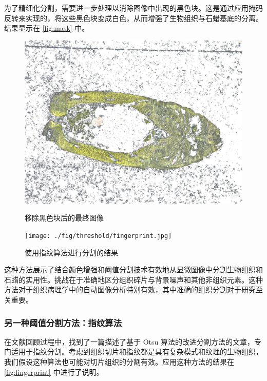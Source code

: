为了精细化分割，需要进一步处理以消除图像中出现的黑色块。这是通过应用掩码反转来实现的，将这些黑色块变成白色，从而增强了生物组织与石蜡基底的分离。结果显示在 \autoref{fig:mask} 中。

\begin{figure}[H]
    \centering
    \begin{minipage}{0.4\textwidth}
        \centering
        \includegraphics[width=\textwidth]{./fig/threshold/final.jpg}
        \caption{移除黑色块后的最终图像}
        \label{fig:mask}
    \end{minipage}
    \begin{minipage}{0.4\textwidth}
        \centering
        \texttt{[image: ./fig/threshold/fingerprint.jpg]}
        \caption{使用指纹算法进行分割的结果}
        \label{fig:fingerprint}
    \end{minipage}
\end{figure}

这种方法展示了结合颜色增强和阈值分割技术有效地从显微图像中分割生物组织和石蜡的实用性。挑战在于准确地区分组织碎片与背景噪声和其他非组织元素。这种方法对于组织病理学中的自动图像分析特别有效，其中准确的组织分割对于研究至关重要。

\subsubsection{另一种阈值分割方法：指纹算法}
在文献回顾过程中，找到了一篇描述了基于 Otsu 算法的改进分割方法的文章，专门适用于指纹分割。考虑到组织切片和指纹都是具有复杂模式和纹理的生物组织，我们假设这种算法也可能对切片组织的分割有效。应用这种方法的结果在 \autoref{fig:fingerprint} 中进行了说明。

